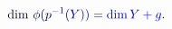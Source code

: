 \documentclass[12pt]{article}
\begin{document}
\makeatletter
\renewcommand*{\@textcolor}[3]{%
  \protect\leavevmode
  \begingroup
    \color#1{#2}#3%
  \endgroup
}
\makeatother
\begin{displaymath}
\mathrm { \mathcolor[RGB]{0,0,15}{d} \mathcolor[RGB]{0,0,30}{i} \mathcolor[RGB]{0,0,45}{m} } ~ \mathcolor[RGB]{0,0,60}{\phi} \mathcolor[RGB]{0,0,75}{(} \mathcolor[RGB]{0,0,90}{p} ^ { \mathcolor[RGB]{0,0,105}{-} \mathcolor[RGB]{0,0,120}{1} } \mathcolor[RGB]{0,0,135}{(} \mathcolor[RGB]{0,0,150}{Y} \mathcolor[RGB]{0,0,165}{)} \mathcolor[RGB]{0,0,180}{)} \mathcolor[RGB]{0,0,195}{=} \mathcolor[RGB]{0,0,210}{\dim} \mathcolor[RGB]{0,0,225}{Y} \mathcolor[RGB]{0,0,240}{+} \mathcolor[RGB]{0,0,255}{g} \mathcolor[RGB]{0,15,0}{.}
\end{displaymath}
\end{document}
